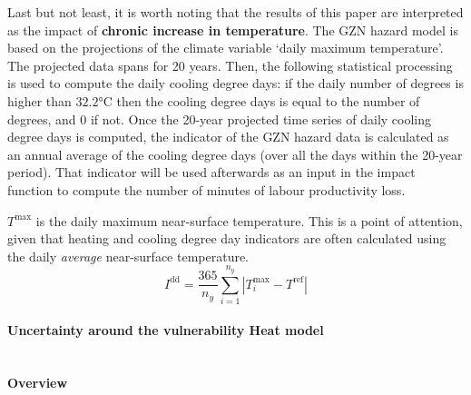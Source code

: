 Last but not least, it is worth noting that the results of this paper are interpreted as the impact of \textbf{chronic increase in temperature}.
The GZN hazard  model is based on the projections of the climate variable `daily maximum temperature'. The projected data spans for 20 years. Then, the following statistical processing is used to compute the daily cooling degree days: if the daily number of degrees is higher than $32.2$°C then the cooling degree days is equal to the number of degrees, and 0 if not. Once the 20-year projected time series of daily cooling degree days is computed, the indicator of the GZN hazard data is calculated as an annual average of the cooling degree days (over all the days within the 20-year period). That indicator will be used afterwards as an input in the impact function to compute the number of minutes of labour productivity loss. %

$T^\text{max}$ is the daily maximum near-surface temperature. This is a point of attention, given that heating and cooling degree day indicators are often calculated using the daily \emph{average} near-surface temperature.
\begin{equation}
    \label{Eq:degree_days}
    I^\text{dd} = \frac{365}{n_y} \sum_{i = 1}^{n_y} |  T^\text{max}_i - T^\text{ref} |
\end{equation}

\paragraph{Uncertainty around the vulnerability Heat model\\}
\textbf{\\Overview}

